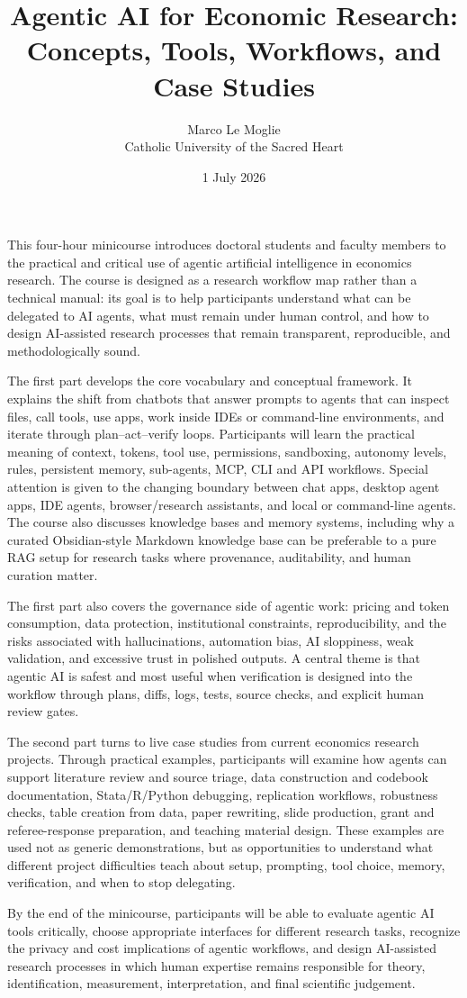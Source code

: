 \documentclass[11pt]{article}
\title{\textbf{Agentic AI for Economic Research:\\ Concepts, Tools, Workflows, and Case Studies}}
\author{Marco Le Moglie\\Catholic University of the Sacred Heart}
\date{1 July 2026}
\begin{document}
\maketitle

\noindent
This four-hour minicourse introduces doctoral students and faculty members to
the practical and critical use of agentic artificial intelligence in economics
research. The course is designed as a research workflow map rather than a
technical manual: its goal is to help participants understand what can be
delegated to AI agents, what must remain under human control, and how to design
AI-assisted research processes that remain transparent, reproducible, and
methodologically sound.

\medskip
\noindent
The first part develops the core vocabulary and conceptual framework. It
explains the shift from chatbots that answer prompts to agents that can inspect
files, call tools, use apps, work inside IDEs or command-line environments, and
iterate through plan--act--verify loops. Participants will learn the practical
meaning of context, tokens, tool use, permissions, sandboxing, autonomy levels,
rules, persistent memory, sub-agents, MCP, CLI and API workflows. Special
attention is given to the changing boundary between chat apps, desktop agent
apps, IDE agents, browser/research assistants, and local or command-line
agents. The course also discusses knowledge bases and memory systems, including
why a curated Obsidian-style Markdown knowledge base can be preferable to a
pure RAG setup for research tasks where provenance, auditability, and human
curation matter.

\medskip
\noindent
The first part also covers the governance side of agentic work: pricing and
token consumption, data protection, institutional constraints, reproducibility,
and the risks associated with hallucinations, automation bias, AI sloppiness,
weak validation, and excessive trust in polished outputs. A central theme is
that agentic AI is safest and most useful when verification is designed into
the workflow through plans, diffs, logs, tests, source checks, and explicit
human review gates.

\medskip
\noindent
The second part turns to live case studies from current economics research
projects. Through practical examples, participants will examine how agents can
support literature review and source triage, data construction and codebook
documentation, Stata/R/Python debugging, replication workflows, robustness
checks, table creation from data, paper rewriting, slide production, grant and
referee-response preparation, and teaching material design. These examples are
used not as generic demonstrations, but as opportunities to understand what
different project difficulties teach about setup, prompting, tool choice,
memory, verification, and when to stop delegating.

\medskip
\noindent
By the end of the minicourse, participants will be able to evaluate agentic AI
tools critically, choose appropriate interfaces for different research tasks,
recognize the privacy and cost implications of agentic workflows, and design
AI-assisted research processes in which human expertise remains responsible for
theory, identification, measurement, interpretation, and final scientific
judgement.
\end{document}
